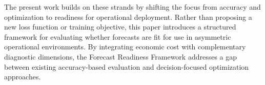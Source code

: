 The present work builds on these strands by shifting the focus from accuracy and optimization to
readiness for operational deployment. Rather than proposing a new loss function or training
objective, this paper introduces a structured framework for evaluating whether forecasts are fit for
use in asymmetric operational environments. By integrating economic cost with complementary
diagnostic dimensions, the Forecast Readiness Framework addresses a gap between existing
accuracy-based evaluation and decision-focused optimization approaches.
